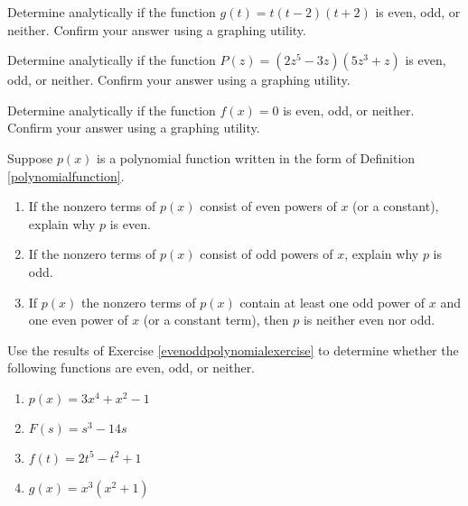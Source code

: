 \documentclass{ximera}
\begin{document}
\begin{problem}
Determine analytically if the function $g(t) = t(t-2)(t+2)$ is even, odd, or neither.  Confirm your answer using a graphing utility.  
\end{problem}

\begin{problem}
Determine analytically if the function $P(z) = (2z^{5} - 3z)(5z^3+z)$ is even, odd, or neither.  Confirm your answer using a graphing utility.  
\end{problem}
 
\begin{problem}\label{evenoddornotpolylast}
Determine analytically if the function $f(x) =0$ is even, odd, or neither.  Confirm your answer using a graphing utility.  
\end{problem}

\begin{problem}\label{evenoddpolynomialexercise}
Suppose $p(x)$ is a polynomial function written in the form of  Definition \ref{polynomialfunction}.

\begin{enumerate}

\item  If the nonzero terms of $p(x)$ consist of even powers of $x$ (or a constant), explain why $p$ is even.

\item   If the nonzero terms of $p(x)$ consist of odd powers of $x$, explain why $p$ is odd.

\item  If $p(x)$ the nonzero terms of $p(x)$  contain at least one odd power of $x$ and one even power of $x$ (or a constant term), then $p$ is neither even nor odd.

\end{enumerate}
\end{problem}


\begin{problem}
Use the results of Exercise \ref{evenoddpolynomialexercise} to determine whether the following functions are even, odd, or neither.

\begin{enumerate}
    \item $p(x) = 3x^4 + x^2 - 1$

    \item $F(s) = s^3 - 14s$

    \item $f(t) = 2t^5 - t^2 + 1$

    \item $g(x) =x^3(x^2+1)$
\end{enumerate}
\end{problem}
\end{document}
